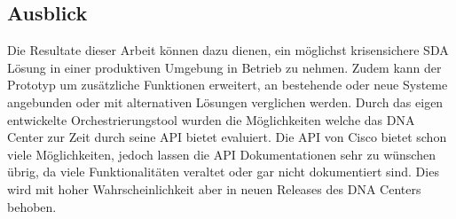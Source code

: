 \subsection{Ausblick}
Die Resultate dieser Arbeit können dazu dienen, ein möglichst krisensichere SDA Lösung in einer produktiven Umgebung in Betrieb zu nehmen. Zudem kann der Prototyp um zusätzliche Funktionen erweitert, an bestehende oder neue Systeme angebunden oder mit alternativen Lösungen verglichen werden. Durch das eigen entwickelte Orchestrierungstool wurden die Möglichkeiten welche das DNA Center zur Zeit durch seine API bietet evaluiert. Die API von Cisco bietet schon viele Möglichkeiten, jedoch lassen die API Dokumentationen sehr zu wünschen übrig, da viele Funktionalitäten veraltet oder gar nicht dokumentiert sind. Dies wird mit hoher Wahrscheinlichkeit aber in neuen Releases des DNA Centers behoben.
